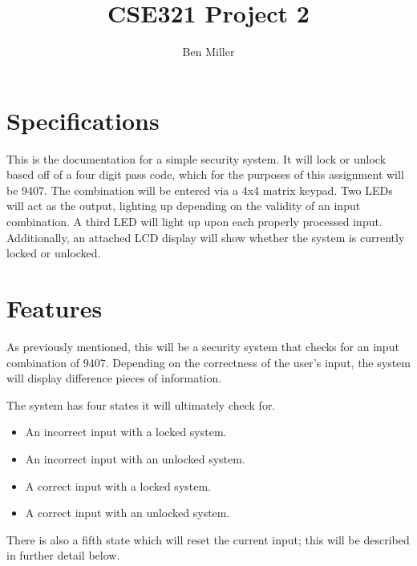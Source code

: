 \documentclass[10pt,a4paper]{article}
\author{Ben Miller}
\title{CSE321 Project 2}
\begin{document}
	\maketitle
	\pagebreak
	\tableofcontents
	\pagebreak
	\section{Specifications}
	This is the documentation for a simple security system. It will lock or unlock based off of a four digit pass code, which for the purposes of this assignment will be 9407. The combination will be entered via a 4x4 matrix keypad. Two LEDs will act as the output, lighting up depending on the validity of an input combination. A third LED will light up upon each properly processed input. Additionally, an attached LCD display will show whether the system is currently locked or unlocked.
	\pagebreak
	\section{Features}
	As previously mentioned, this will be a security system that checks for an input combination of 9407. Depending on the correctness of the user's input, the system will display difference pieces of information.
	
	The system has four states it will ultimately check for.
	\begin{itemize}
		\item An incorrect input with a locked system.
		\item An incorrect input with an unlocked system.
		\item A correct input with a locked system.
		\item A correct input with an unlocked system.
	\end{itemize}
	There is also a fifth state which will reset the current input; this will be described in further detail below. 
	
\end{document}

